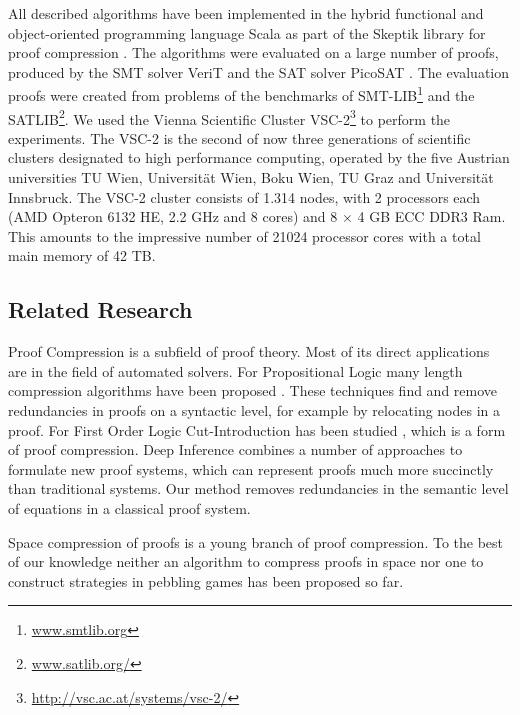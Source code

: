 All described algorithms have been implemented in the hybrid functional and object-oriented programming
language Scala as part of the Skeptik library for proof compression \cite{Boudou2014}.
The algorithms were evaluated on a large number of proofs, produced by the SMT solver VeriT and the SAT solver PicoSAT \cite{Biere2008}.
The evaluation proofs were created from problems of the benchmarks of SMT-LIB\footnote{\url{www.smtlib.org}} and the SATLIB\footnote{\url{www.satlib.org/}}.
We used the Vienna Scientific Cluster VSC-2\footnote{\url{http://vsc.ac.at/systems/vsc-2/}} to perform the experiments.
The VSC-2 is the second of now three generations of scientific clusters designated to high performance computing, operated by the five Austrian universities TU Wien, Universit\"at Wien, Boku Wien, TU Graz and Universit\"at Innsbruck. 
The VSC-2 cluster consists of 1.314 nodes, with 2 processors each (AMD Opteron 6132 HE, 2.2 GHz and 8 cores) and 8 $\times$ 4 GB ECC DDR3 Ram.
This amounts to the impressive number of 21024 processor cores with a total main memory of 42 TB.


\subsection{Related Research}

Proof Compression is a subfield of proof theory.
Most of its direct applications are in the field of automated solvers.
For Propositional Logic many length compression algorithms have been proposed \cite{Bar-Ilan2008,Bloem,Boudou2013,Cotton2010,Fontaine2011}.
These techniques find and remove redundancies in proofs on a syntactic level, for example by relocating nodes in a proof.
For First Order Logic Cut-Introduction has been studied \cite{Hetzl2012}, which is a form of proof compression.
Deep Inference \cite{Bruscoli2009} combines a number of approaches to formulate new proof systems, which can represent proofs much more succinctly than traditional systems.
Our method removes redundancies in the semantic level of equations in a classical proof system.

Space compression of proofs is a young branch of proof compression.
To the best of our knowledge neither an algorithm to compress proofs in space nor one to construct strategies in pebbling games has been proposed so far. 

